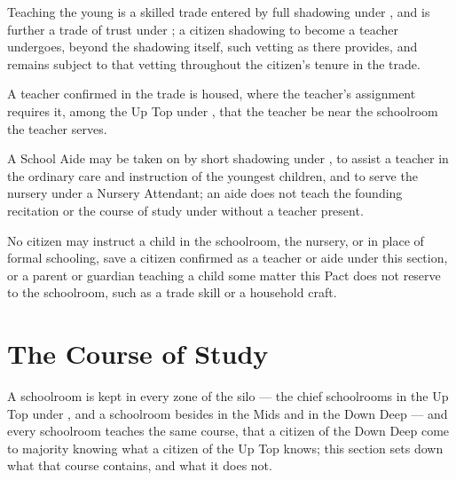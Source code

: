 \begin{clauses}
\item Teaching the young is a skilled trade entered by full shadowing under , and is further a trade of trust under ; a citizen shadowing to become a teacher undergoes, beyond the shadowing itself, such vetting as  there provides, and remains subject to that vetting throughout the citizen's tenure in the trade.
\item A teacher confirmed in the trade is housed, where the teacher's assignment requires it, among the Up Top under , that the teacher be near the schoolroom the teacher serves.
\item A School Aide may be taken on by short shadowing under , to assist a teacher in the ordinary care and instruction of the youngest children, and to serve the nursery under a Nursery Attendant; an aide does not teach the founding recitation or the course of study under  without a teacher present.
\item No citizen may instruct a child in the schoolroom, the nursery, or in place of formal schooling, save a citizen confirmed as a teacher or aide under this section, or a parent or guardian teaching a child some matter this Pact does not reserve to the schoolroom, such as a trade skill or a household craft.
\end{clauses}

\section{The Course of Study}
\label{sec:schooling:course-of-study}

A schoolroom is kept in every zone of the silo --- the chief schoolrooms in the Up Top under , and a schoolroom besides in the Mids and in the Down Deep --- and every schoolroom teaches the same course, that a citizen of the Down Deep come to majority knowing what a citizen of the Up Top knows; this section sets down what that course contains, and what it does not.

